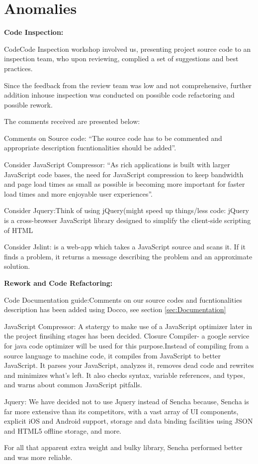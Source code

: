 \section{Anomalies} %
\label{sec:Anomalies}

\textbf{Code Inspection:}

CodeCode Inspection workshop involved us, presenting project source code to an inspection team,
who upon reviewing, complied a set of suggestions and best practices.

Since the feedback from the review team was low and not comprehensive, further addition inhouse inspection was conducted on possible 
code refactoring and possible rework.

The comments received are presented below:

Comments on Source code: ``The source code has to be commented and appropriate description fucntionalities should be added''.

Consider JavaScript Compressor: ``As rich applications is built with larger JavaScript code bases, the need for JavaScript compression 
to keep bandwidth and page load times as small as possible is becoming more important for faster load times and more enjoyable user experiences''.

Consider Jquery:Think of using jQuery(might speed up things/less code: jQuery is a cross-browser JavaScript library designed to simplify the client-side scripting of HTML
 
Consider Jslint: is a web-app which takes a JavaScript source and scans it. If it finds a problem, it returns a message describing the problem and an approximate solution. 


\textbf{Rework and Code Refactoring:}

Code Documentation guide:Comments on our source codes and fucntionalities description has been added using Docco, see section \ref{sec:Documentation}

JavaScript Compressor: A statergy to make use of a JavaScript optimizer later in the project finsihing stages has been decided.
Closure Compiler- a google service for java code optimizer will be used for this purpose.Instead of compiling from a source language to machine code, it compiles from JavaScript to better JavaScript. It parses your JavaScript, analyzes it, removes dead code and rewrites and minimizes what's left. 
It also checks syntax, variable references, and types, and warns about common JavaScript pitfalls. 

Jquery: We have decided not to use Jquery instead of Sencha because, Sencha is far more extensive than its competitors, with a vast array of UI    
components, explicit iOS and Android support, storage and data binding facilities using JSON and HTML5 offline storage, and more.

For all that apparent extra weight and bulky library, Sencha performed better and was more reliable.

